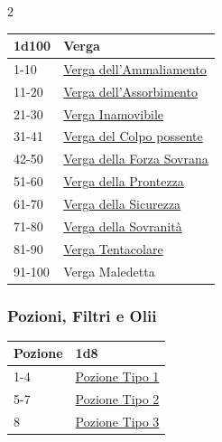 \begin{multicols}{2}
{{\small\begin{tabularx}{\linewidth}{ll}
		\toprule
\rowcolor{gray!20}\textbf{1d100} & \textbf{Verga}\\
\toprule
1-10 & \hyperlink{Verga dell'Ammaliamento}{Verga dell'Ammaliamento}\\
\rowcolor{gray!20}11-20 & \hyperlink{Verga dell'Assorbimento}{Verga dell'Assorbimento}\\
21-30 & \hyperlink{Verga Inamovibile}{Verga Inamovibile}\\
\rowcolor{gray!20}31-41 & \hyperlink{Verga del Colpo possente}{Verga del Colpo possente}\\
42-50 & \hyperlink{Verga della Forza Sovrana}{Verga della Forza Sovrana}\\
\rowcolor{gray!20}51-60 & \hyperlink{Verga della Prontezza}{Verga della Prontezza}\\
61-70 & \hyperlink{Verga della Sicurezza}{Verga della Sicurezza}\\
\rowcolor{gray!20}71-80 & \hyperlink{Verga della Sovranità}{Verga della Sovranità}\\
81-90 & \hyperlink{Verga Tentacolare}{Verga Tentacolare}\\
\rowcolor{gray!20}91-100 & Verga Maledetta\\
\end{tabularx}}

\subsubsection{Pozioni, Filtri e Olii}\hypertarget{pozionifiltri}{}\label{pozionifiltri}

{\small\begin{tabularx}{\linewidth}{ll}
		\toprule
\rowcolor{gray!20}\textbf{Pozione}&\textbf{1d8}\\
\toprule
 1-4&\hyperlink{pozionifiltri}{Pozione Tipo 1}\\
 \rowcolor{gray!20}5-7&\hyperlink{pozionifiltri}{Pozione Tipo 2}\\
 8  &\hyperlink{pozionifiltri}{Pozione Tipo 3}
\end{tabularx}}

\medskip\hypertarget{Pozione Tipo 1}{}

}
\end{multicols}
